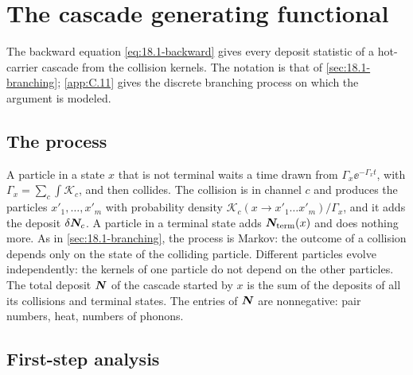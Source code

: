 \section{The cascade generating functional}\label{app:D.43}

The backward equation \cref{eq:18.1-backward} gives every deposit statistic of a hot-carrier cascade from the collision kernels. The notation is that of \cref{sec:18.1-branching}; \cref{app:C.11} gives the discrete branching process on which the argument is modeled.

\subsection{The process}

A particle in a state $x$ that is not terminal waits a time drawn from $\varGamma_x\ee^{-\varGamma_xt}$, with $\varGamma_x = \sum_c\int\mathscr{K}_c$, and then collides. The collision is in channel $c$ and produces the particles $x'_1, \dots, x'_m$ with probability density $\mathscr{K}_c(x \to x'_1\dots x'_m)/\varGamma_x$, and it adds the deposit $\delta\bm{N}_c$. A particle in a terminal state adds $\bm{N}_{\mathrm{term}}(x)$ and does nothing more. As in \cref{sec:18.1-branching}, the process is Markov: the outcome of a collision depends only on the state of the colliding particle. Different particles evolve independently: the kernels of one particle do not depend on the other particles. The total deposit $\bm{N}$ of the cascade started by $x$ is the sum of the deposits of all its collisions and terminal states. The entries of $\bm{N}$ are nonnegative: pair numbers, heat, numbers of phonons.

\subsection{First-step analysis}

